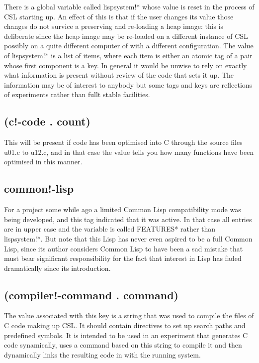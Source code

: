 \documentclass[a4paper,11pt]{article}
\begin{document}
There is a global variable called {\ttfamily lispsystem!*} whose value is
reset in the process of CSL starting up. An effect of this is that if the
user changes its value those changes do not survice a preserving and
re-loading a heap image: this is deliberate since the heap image may be
re-loaded on a different instance of CSL possibly on a quite different
computer of with a different configuration. The value of {\ttfamily
lispsystem!*} is a list of items, where each item is either an atomic tag
of a pair whose first component is a key. In general it would be unwise
to rely on exactly what information is present without review of the code
that sets it up. The information may be of interest to anybody but some tags
and keys are reflections of experiments rather than fullt stable facilities.

\subsection{\ttfamily (c!-code . count)}
This will be present if code has been optimised into C through the source
files u01.c to u12.c, and in that case the value tells you how many functions
have been optimised in this manner.

\subsection{\ttfamily common!-lisp}
For a project some while ago a limited Common Lisp compatibility mode was
being developed, and this tag indicated that it was active. In that case all
entries are in upper case and the variable is called {\ttfamily *FEATURES*}
rather than {\ttfamily lispsystem!*}. But note that this Lisp has never even
aspired to be a full Common Lisp, since its author considers Common Lisp to
have been a sad mistake that must bear significant responsibility for the
fact that interest in Lisp has faded dramatically since its introduction.

\subsection{\ttfamily (compiler!-command . command)}
The value associated with this key is a string that was used to compile the
files of C code making up CSL. It should contain directives to set up
search paths and predefined symbols. It is intended to be used in an
experiment that generates C code synamically, uses a command based on this
string to compile it and then dynamically links the resulting code in with
the running system.
\end{document}
